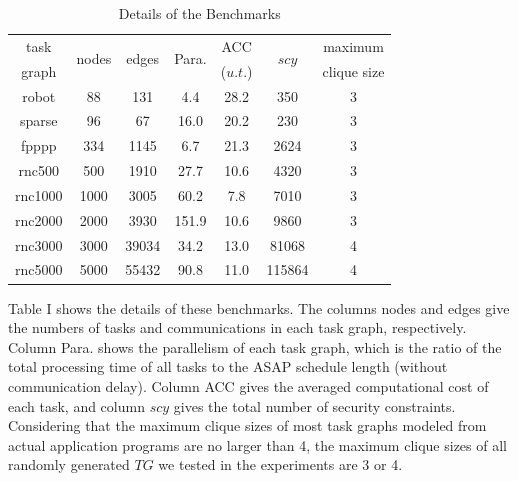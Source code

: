 \documentclass[10pt,journal]{IEEEtran}
\begin{document}
\begin{table}[!h]
\renewcommand{\arraystretch}{1.1}
\caption{Details of the Benchmarks}
\centering
\begin{tabular}{c|c|c|c|c|c|c}
\hline
\hline

task    &\multicolumn{1}{c|}{\multirow{2}{*}{nodes}}     &\multicolumn{1}{c|}{\multirow{2}{*}{edges}}     &\multicolumn{1}{c|}{\multirow{2}{*}{Para. }}  &ACC  &\multicolumn{1}{c|}{\multirow{2}{*}{$scy$}}   &maximum  \\
graph   &                                            &           &        & ($u.t.$)     &      & clique size       \\
\hline
\hline

robot   &88   &131     &4.4 &28.2  &350 &3 \\

sparse  &96   &67    &16.0  &20.2 &230  &3 \\

fpppp   &334   &1145    &6.7  &21.3 &2624   &3  \\

rnc500  &500   &1910    &27.7  &10.6  &4320  &3  \\

rnc1000  &1000   &3005   &60.2  &7.8 &7010 &3 \\

rnc2000   &2000   &3930   &151.9  &10.6 &9860  &3 \\

rnc3000   &3000   &39034    &34.2 &13.0 &81068  &4  \\

rnc5000   &5000   &55432   &90.8  &11.0 &115864 &4 \\

\hline
\hline
\end{tabular}
\label{table:detail}
\end{table}


Table I shows the details of these benchmarks. The columns nodes and edges give the numbers of tasks and communications in each task graph, respectively. Column Para. shows the parallelism of each task graph, which is the ratio of the total processing time of all tasks to the ASAP schedule length (without communication delay). Column ACC gives the averaged computational cost of each task, and column $scy$ gives the total number of security constraints. Considering that the maximum clique sizes of most task graphs modeled from actual application programs are no larger than 4\cite{article:CL}, the maximum clique sizes of all randomly generated $TG$ we tested in the experiments are 3 or 4.
\end{document}

